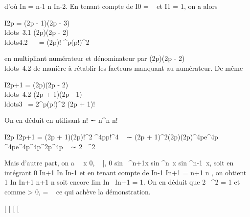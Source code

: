 d'où In = n-1 \over n In-2. En
tenant compte de I0 = \pi~  et
I1 = 1, on a alors

I2p = (2p - 1)(2p -
3)\\ldots~3.1
\over (2p)(2p -
2)\\ldots4.2~  \pi~
 = (2p)! ^p(p!)^2  \pi~ 

en multipliant numérateur et dénominateur par (2p)(2p -
2)\\ldots~4.2 de
manière à rétablir les facteurs manquant au numérateur. De même

I2p+1 = (2p)(2p -
2)\\ldots~4.2
\over (2p + 1)(2p -
1)\\ldots3~ =
2^p(p!)^2 \over (2p + 1)!

On en déduit en utilisant n! ∼ \ell\sqrtn
n^n \over n!

 I2p \over I2p+1 = (2p +
1)(2p)!^2 ^4pp!^4  \pi~  ∼ (2p +
1)\ell^2(2p)(2p)^4pe^4p
^4pe^4p\ell^4p^2p^4p
 \pi~  ∼ 2\pi~ \over
\ell^2

Mais d'autre part, on a \forall~~x \in {[}0, \pi~
 {]}, 0 \leq sin~
^n+1x \leq sin ^n~x
\leq sin ^n-1~x, soit en intégrant 0 \leq
In+1 \leq In \leq In-1 et en tenant compte de 
In-1 \over In+1 = n+1
\over n , on obtient 1 \leq In
\over In+1 \leq n+1 \over n
soit encore lim In~
\over In+1 = 1. On en déduit que  2\pi~
\over \ell^2 = 1 et comme \ell \textgreater{} 0, \ell
= \pi~ ce qui achève la démonstration.

{[}
{[}
{[}
{[}

